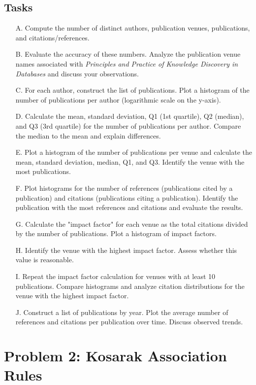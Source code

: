\documentclass{article}
\begin{document}
\subsection*{Tasks}
\begin{enumerate}
    \item[A.] Compute the number of distinct authors, publication venues, publications, and citations/references.
    \item[B.] Evaluate the accuracy of these numbers. Analyze the publication venue names associated with \textit{Principles and Practice of Knowledge Discovery in Databases} and discuss your observations.
    \item[C.] For each author, construct the list of publications. Plot a histogram of the number of publications per author (logarithmic scale on the y-axis).
    \item[D.] Calculate the mean, standard deviation, Q1 (1st quartile), Q2 (median), and Q3 (3rd quartile) for the number of publications per author. Compare the median to the mean and explain differences.
    \item[E.] Plot a histogram of the number of publications per venue and calculate the mean, standard deviation, median, Q1, and Q3. Identify the venue with the most publications.
    \item[F.] Plot histograms for the number of references (publications cited by a publication) and citations (publications citing a publication). Identify the publication with the most references and citations and evaluate the results.
    \item[G.] Calculate the "impact factor" for each venue as the total citations divided by the number of publications. Plot a histogram of impact factors.
    \item[H.] Identify the venue with the highest impact factor. Assess whether this value is reasonable.
    \item[I.] Repeat the impact factor calculation for venues with at least 10 publications. Compare histograms and analyze citation distributions for the venue with the highest impact factor.
    \item[J.] Construct a list of publications by year. Plot the average number of references and citations per publication over time. Discuss observed trends.
\end{enumerate}

\section*{Problem 2: Kosarak Association Rules}
\end{document}
